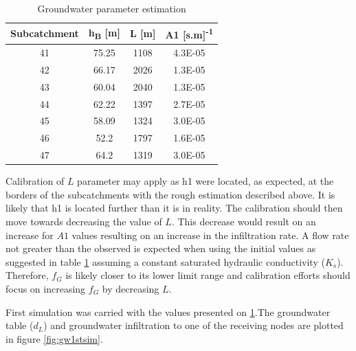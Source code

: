 \begin{table}[h]
\caption{Groundwater parameter estimation}
\label{tbl:gwparamest}
\centering
\begin{tabular}{cccc}
\toprule
\multicolumn{1}{l}{\textbf{Subcatchment}} & \textbf{h\textsubscript{B} {[}m{]}} & \textbf{L {[}m{]}} & \textbf{A1  {[}s.m{]}\textsuperscript{-1}} \\ \hline
41                                        & 75.25                 & 1108               & 4.3E-05                                    \\
42                                        & 66.17                 & 2026               & 1.3E-05                                    \\
43                                        & 60.04                 & 2040               & 1.3E-05                                    \\
44                                        & 62.22                 & 1397               & 2.7E-05                                    \\
45                                        & 58.09                 & 1324               & 3.0E-05                                    \\
46                                        & 52.2                  & 1797               & 1.6E-05                                    \\
47                                        & 64.2                  & 1319               & 3.0E-05                                   \\
\bottomrule
\end{tabular}
\end{table}
 
Calibration of $L$ parameter may apply as h1 were located, as expected, at the borders of the subcatchments with the rough estimation described above. It is likely that h1 is located further than it is in reality. The calibration should then move towards decreasing the value of $L$. This decrease would result on an increase for $A1$ values resulting on an increase in the infiltration rate. A flow rate not greater than the observed is expected when using the initial values as suggested in table \ref{tbl:gwparamest} assuming a constant saturated hydraulic conductivity ($K_s$). Therefore, $f_G$ is likely closer to its lower limit range and calibration efforts should focus on increasing $f_G$ by decreasing $L$. 

First simulation was carried with the values presented on \ref{tbl:gwparamest}.The groundwater table ($d_L$) and groundwater infiltration to one of the receiving nodes are plotted in figure \ref{fig:gw1stsim}. 



